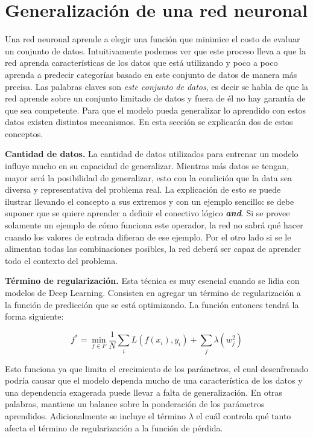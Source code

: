 \section{Generalización de una red neuronal}

Una red neuronal aprende a elegir una función que minimice el costo de evaluar un conjunto de datos. Intuitivamente podemos ver que este proceso lleva a que la red aprenda características de los datos que está utilizando y poco a poco aprenda a predecir categorías basado en este conjunto de datos de manera más precisa. Las palabras claves son \textit{este conjunto de datos}, es decir se habla de que la red aprende sobre un conjunto limitado de datos y fuera de él no hay garantía de que sea competente. Para que el modelo pueda generalizar lo aprendido con estos datos existen distintos mecanismos. En esta sección se explicarán dos de estos conceptos.

\textbf{Cantidad de datos.} La cantidad de datos utilizados para entrenar un modelo influye mucho en su capacidad de generalizar. Mientras más datos se tengan, mayor será la posibilidad de generalizar, esto con la condición que la data sea diversa y representativa del problema real. La explicación de esto se puede ilustrar llevando el concepto a sus extremos y con un ejemplo sencillo: se debe suponer que se quiere aprender a definir el conectivo lógico \textbf{\textit{and}}. Si se provee solamente un ejemplo de cómo funciona este operador, la red no sabrá qué hacer cuando los valores de entrada difieran de ese ejemplo. Por el otro lado si se le alimentan todas las combinaciones posibles, la red deberá ser capaz de aprender todo el contexto del problema.

\textbf{Término de regularización.} Esta técnica es muy esencial cuando se lidia con modelos de Deep Learning. Consisten en agregar un término de regularización a la función de predicción que se está optimizando. La función entonces tendrá la forma siguiente: %

\[ f^* = \min_{f \in F} \frac{1}{N} \sum_{i} L(f(x_i), y_i) + \sum_{j} \lambda(w_j^2) \]

Esto funciona ya que limita el crecimiento de los parámetros, el cual desenfrenado podría causar que el modelo dependa mucho de una característica de los datos y una dependencia exagerada puede llevar a falta de generalización. En otras palabras, mantiene un balance sobre la ponderación de los parámetros aprendidos. Adicionalmente se incluye el término $\lambda$ el cuál controla qué tanto afecta el término de regularización a la función de pérdida.

